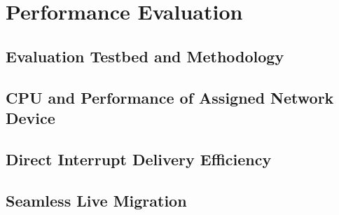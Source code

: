 \section{Performance Evaluation}

\subsection{Evaluation Testbed and Methodology}


\subsection{CPU and Performance of Assigned Network Device}

\subsection{Direct Interrupt Delivery Efficiency}

\subsection{Seamless Live Migration}
